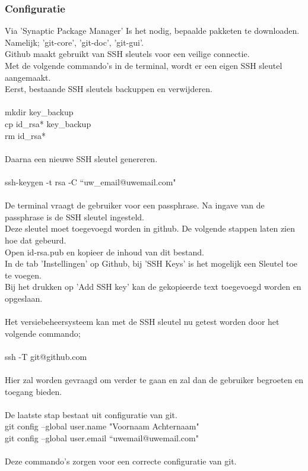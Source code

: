 \documentclass[12pt]{article}
\begin{document}
				\subsubsection{Configuratie}
					Via 'Synaptic Package Manager' Is het nodig, bepaalde pakketen te downloaden. Namelijk; 'git-core', 'git-doc', 'git-gui'.\\
					Github maakt gebruikt van SSH sleutels voor een veilige connectie.\\
					Met de volgende commando's in de terminal, wordt er een eigen SSH sleutel aangemaakt.\\
					Eerst, bestaande SSH sleutels backuppen en verwijderen.\\
					\\
					mkdir key\_backup\\
					cp id\_rsa* key\_backup\\
					rm id\_rsa*
					\\
					\\
					 Daarna een nieuwe SSH sleutel genereren.\\
					 \\
					 ssh-keygen -t rsa -C \textquotedblleft uw\_email@uwemail.com"\\
					 \\
					 De terminal vraagt de gebruiker voor een passphrase.
					 Na ingave van de passphrase is de SSH sleutel ingesteld.\\
					Deze sleutel moet toegevoegd worden in github. De volgende stappen laten zien hoe dat gebeurd.\\
					 Open id-rsa.pub en kopieer de inhoud van dit bestand.\\
					 In de tab 'Instellingen' op Github, bij 'SSH Keys' is het mogelijk een Sleutel toe te voegen.\\
					 Bij het drukken op 'Add SSH key' kan de gekopieerde text toegevoegd worden en opgeslaan.\\
					 \\
					 Het versiebeheersysteem kan met de SSH sleutel nu getest worden door het volgende commando;\\
					 \\
					 ssh -T git@github.com\\
					 \\
					 Hier zal worden gevraagd om verder te gaan en zal dan de gebruiker begroeten en toegang bieden.\\
					 \\
					 De laatste stap bestaat uit configuratie van git.\\
					 git config --global user.name "Voornaam Achternaam"\\
					 git config --global user.email \textquotedblleft uwemail@uwemail.com"\\
					 \\
					 Deze commando's zorgen voor een correcte configuratie van git.\\
					 \\
				\cite{Git}				
				
\end{document}

